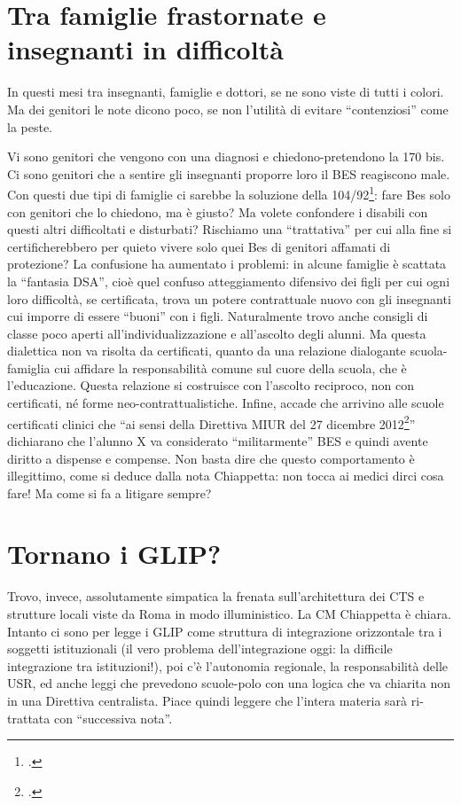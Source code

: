 \section*{Tra famiglie frastornate e insegnanti in difficoltà}
In questi mesi tra insegnanti, famiglie e dottori, se ne sono viste di tutti i colori. Ma dei genitori   le note dicono poco,  se non l'utilità di evitare  “contenziosi” come la peste.

Vi sono genitori che vengono con una diagnosi e chiedono-pretendono la 170 bis. Ci sono genitori che a sentire gli insegnanti proporre loro il BES reagiscono male. Con questi due tipi di famiglie ci sarebbe la soluzione della 104/92\footcite{Legge_104_92}: fare Bes solo con genitori che lo chiedono, ma è giusto? Ma volete confondere i disabili con questi altri difficoltati e disturbati? Rischiamo una “trattativa” per cui alla fine si certificherebbero per quieto vivere solo quei Bes di genitori affamati di protezione?
La confusione ha aumentato i problemi: in alcune famiglie è scattata la “fantasia DSA”, cioè quel confuso atteggiamento difensivo dei figli per cui ogni loro difficoltà, se certificata, trova un potere contrattuale nuovo con gli insegnanti cui imporre di essere “buoni” con i figli. Naturalmente  trovo anche consigli di classe poco aperti all'individualizzazione e all'ascolto degli alunni. Ma questa dialettica non va risolta da certificati, quanto da una relazione dialogante scuola-famiglia cui affidare   la responsabilità comune sul cuore della scuola, che è l'educazione. Questa relazione si costruisce con l'ascolto reciproco, non con certificati, né forme neo-contrattualistiche.
Infine, accade che arrivino alle scuole certificati clinici che “ai sensi della Direttiva MIUR del 27 dicembre 2012\footcite{dir27Dic2012}” dichiarano che l'alunno X  va considerato “militarmente” BES e quindi avente diritto a dispense e compense. Non basta dire che questo comportamento è illegittimo, come si deduce dalla nota Chiappetta: non tocca ai  medici  dirci cosa fare! Ma come si fa a litigare sempre?
\section*{Tornano i GLIP?}
Trovo, invece, assolutamente simpatica la frenata sull'architettura dei CTS e strutture locali viste da Roma in modo illuministico. La CM Chiappetta è chiara. Intanto ci sono per legge  i GLIP come struttura di integrazione orizzontale tra i soggetti istituzionali (il vero problema dell'integrazione oggi: la difficile integrazione tra istituzioni!), poi c'è l'autonomia regionale, la responsabilità delle USR, ed anche leggi che prevedono scuole-polo con una logica che va chiarita non in una Direttiva centralista. Piace quindi leggere che l'intera materia sarà ri-trattata con “successiva nota”.
